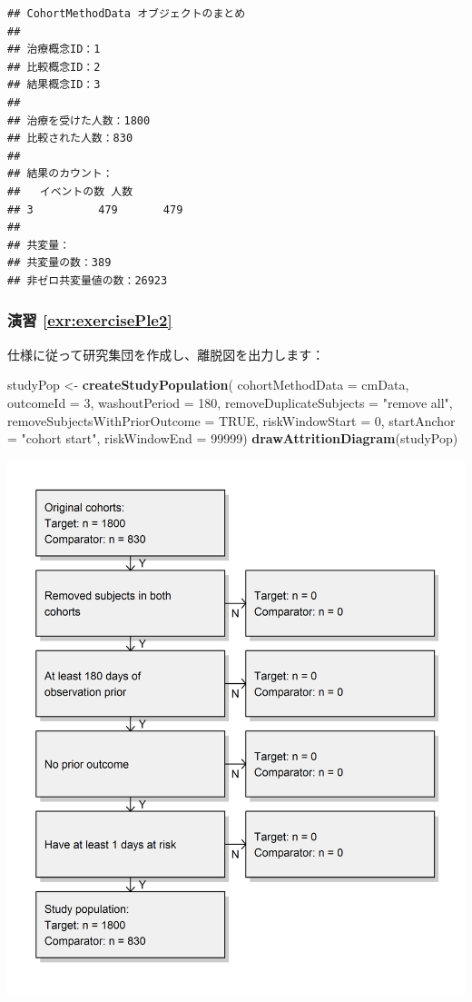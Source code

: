 \documentclass[
  11pt]{book}
\newenvironment{Shaded}{\begin{snugshade}}{\end{snugshade}}
\newcommand{\AttributeTok}[1]{\textcolor[rgb]{0.13,0.29,0.53}{#1}}
\newcommand{\ConstantTok}[1]{\textcolor[rgb]{0.56,0.35,0.01}{#1}}
\newcommand{\DecValTok}[1]{\textcolor[rgb]{0.00,0.00,0.81}{#1}}
\newcommand{\FunctionTok}[1]{\textcolor[rgb]{0.13,0.29,0.53}{\textbf{#1}}}
\newcommand{\NormalTok}[1]{#1}
\newcommand{\OtherTok}[1]{\textcolor[rgb]{0.56,0.35,0.01}{#1}}
\newcommand{\StringTok}[1]{\textcolor[rgb]{0.31,0.60,0.02}{#1}}
\theoremstyle{definition}
\theoremstyle{definition}
\theoremstyle{definition}
\theoremstyle{definition}
\theoremstyle{remark}
\begin{document}
\begin{verbatim}
## CohortMethodData オブジェクトのまとめ
## 
## 治療概念ID：1
## 比較概念ID：2
## 結果概念ID：3
## 
## 治療を受けた人数：1800
## 比較された人数：830
## 
## 結果のカウント：
##   イベントの数 人数
## 3          479       479
## 
## 共変量：
## 共変量の数：389
## 非ゼロ共変量値の数：26923
\end{verbatim}

\subsubsection*{演習 \ref{exr:exercisePle2}}\label{ux6f14ux7fd2-refexrexerciseple2}

仕様に従って研究集団を作成し、離脱図を出力します：

\begin{Shaded}
\begin{Highlighting}[]
\NormalTok{studyPop }\OtherTok{\textless{}{-}} \FunctionTok{createStudyPopulation}\NormalTok{(}
  \AttributeTok{cohortMethodData =}\NormalTok{ cmData,}
  \AttributeTok{outcomeId =} \DecValTok{3}\NormalTok{,}
  \AttributeTok{washoutPeriod =} \DecValTok{180}\NormalTok{,}
  \AttributeTok{removeDuplicateSubjects =} \StringTok{"remove all"}\NormalTok{,}
  \AttributeTok{removeSubjectsWithPriorOutcome =} \ConstantTok{TRUE}\NormalTok{,}
  \AttributeTok{riskWindowStart =} \DecValTok{0}\NormalTok{,}
  \AttributeTok{startAnchor =} \StringTok{"cohort start"}\NormalTok{,}
  \AttributeTok{riskWindowEnd =} \DecValTok{99999}\NormalTok{)}
\FunctionTok{drawAttritionDiagram}\NormalTok{(studyPop)}
\end{Highlighting}
\end{Shaded}

\begin{center}\includegraphics[width=0.8\linewidth]{images/SuggestedAnswers/attrition} \end{center}
\end{document}

